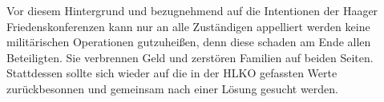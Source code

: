 \documentclass[12pt]{scrartcl}
\begin{document}
Vor diesem Hintergrund und bezugnehmend auf die Intentionen der Haager Friedenskonferenzen kann nur an alle Zuständigen appelliert werden keine militärischen Operationen gutzuheißen, denn diese schaden am Ende allen Beteiligten. Sie verbrennen Geld und zerstören Familien auf beiden Seiten. Stattdessen sollte sich wieder auf die in der HLKO gefassten Werte zurückbesonnen und gemeinsam nach einer Lösung gesucht werden.
\newpage

\printbibliography
{}


\end{document}
